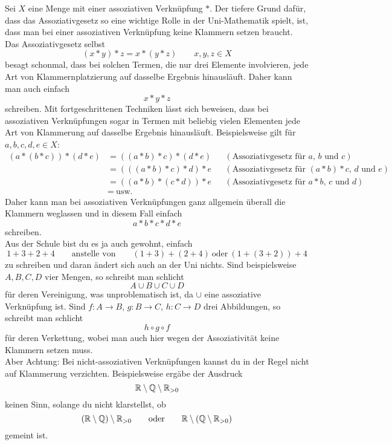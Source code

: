 \begin{bem}
\label{klammerfrei}
Sei $X$ eine Menge mit einer assoziativen Verknüpfung $*$. Der tiefere Grund dafür, dass das Assoziativgesetz so eine wichtige Rolle in der Uni-Mathematik spielt, ist, dass man bei einer assoziativen Verknüpfung keine Klammern setzen braucht. Das Assoziativgesetz selbst
 \[ (x*y)*z = x*(y*z) \qquad x,y,z\in X\]
 besagt schonmal, dass bei solchen Termen, die nur drei Elemente involvieren, jede Art von Klammernplatzierung auf dasselbe Ergebnis hinausläuft. Daher kann man auch einfach
 \[ x*y*z \]
 schreiben. Mit fortgeschrittenen Techniken lässt sich beweisen, dass bei assoziativen Verknüpfungen sogar in Termen mit beliebig vielen Elementen jede Art von Klammerung auf dasselbe Ergebnis hinausläuft. Beispielsweise gilt für $a,b,c,d,e\in X$:
 \begin{align*}
  (a*(b*c))*(d*e) & =((a*b)*c)*(d*e) && (\text{Assoziativgesetz für $a$, $b$ und $c$})\\
& = (((a*b)*c)*d)*e && (\text{Assoziativgesetz für $(a*b)*c$, $d$ und $e$})  \\
  & = ((a*b)*(c*d))*e && (\text{Assoziativgesetz für $a*b$, $c$ und $d$})\\
  &=\ \text{usw.}
 \end{align*}
 Daher kann man bei assoziativen Verknüpfungen ganz allgemein überall die Klammern weglassen und in diesem Fall einfach
 \[ a*b*c*d*e \]
 schreiben. \\
 Aus der Schule bist du es ja auch gewohnt, einfach
 \[ 1+3+2+4 \qquad\text{anstelle von}\qquad (1+3)+(2+4)\ \text{oder}\ (1+(3+2))+4 \]
 zu schreiben und daran ändert sich auch an der Uni nichts. Sind beispielsweise $A,B,C,D$ vier Mengen, so schreibt man schlicht
 \[ A\cup B\cup C \cup D \]
 für deren Vereinigung, was unproblematisch ist, da $\cup$ eine assoziative Verknüpfung ist. Sind $f:A\to B$, $g:B\to C$, $h:C\to D$ drei Abbildungen, so schreibt man schlicht
 \[ h\circ g\circ f \]
 für deren Verkettung, wobei man auch hier wegen der Assoziativität keine Klammern setzen muss. \\[0.5em]
 Aber Achtung: Bei nicht-assoziativen Verknüpfungen kannst du in der Regel nicht auf Klammerung verzichten. Beispielsweise ergäbe der Ausdruck
 \[ {\mathbb R}\setminus {\mathbb Q}\setminus {\mathbb R}_{>0}\]
keinen Sinn, solange du nicht klarstellst, ob
 \[ ({\mathbb R}\setminus {\mathbb Q})\setminus {\mathbb R}_{>0} \qquad\text{oder}\qquad {\mathbb R}\setminus ({\mathbb Q}\setminus {\mathbb R}_{>0}) \]
 gemeint ist.
\end{bem}




